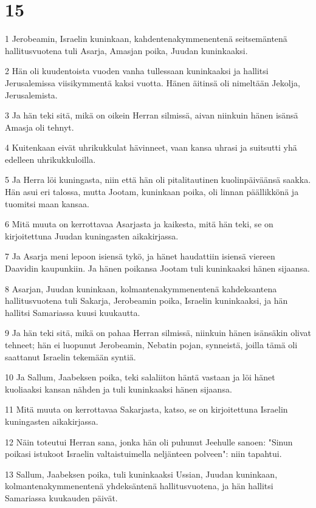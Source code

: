 \chapter{15}

\par 1 Jerobeamin, Israelin kuninkaan, kahdentenakymmenentenä seitsemäntenä hallitusvuotena tuli Asarja, Amasjan poika, Juudan kuninkaaksi.
\par 2 Hän oli kuudentoista vuoden vanha tullessaan kuninkaaksi ja hallitsi Jerusalemissa viisikymmentä kaksi vuotta. Hänen äitinsä oli nimeltään Jekolja, Jerusalemista.
\par 3 Ja hän teki sitä, mikä on oikein Herran silmissä, aivan niinkuin hänen isänsä Amasja oli tehnyt.
\par 4 Kuitenkaan eivät uhrikukkulat hävinneet, vaan kansa uhrasi ja suitsutti yhä edelleen uhrikukkuloilla.
\par 5 Ja Herra löi kuningasta, niin että hän oli pitalitautinen kuolinpäiväänsä saakka. Hän asui eri talossa, mutta Jootam, kuninkaan poika, oli linnan päällikkönä ja tuomitsi maan kansaa.
\par 6 Mitä muuta on kerrottavaa Asarjasta ja kaikesta, mitä hän teki, se on kirjoitettuna Juudan kuningasten aikakirjassa.
\par 7 Ja Asarja meni lepoon isiensä tykö, ja hänet haudattiin isiensä viereen Daavidin kaupunkiin. Ja hänen poikansa Jootam tuli kuninkaaksi hänen sijaansa.
\par 8 Asarjan, Juudan kuninkaan, kolmantenakymmenentenä kahdeksantena hallitusvuotena tuli Sakarja, Jerobeamin poika, Israelin kuninkaaksi, ja hän hallitsi Samariassa kuusi kuukautta.
\par 9 Ja hän teki sitä, mikä on pahaa Herran silmissä, niinkuin hänen isänsäkin olivat tehneet; hän ei luopunut Jerobeamin, Nebatin pojan, synneistä, joilla tämä oli saattanut Israelin tekemään syntiä.
\par 10 Ja Sallum, Jaabeksen poika, teki salaliiton häntä vastaan ja löi hänet kuoliaaksi kansan nähden ja tuli kuninkaaksi hänen sijaansa.
\par 11 Mitä muuta on kerrottavaa Sakarjasta, katso, se on kirjoitettuna Israelin kuningasten aikakirjassa.
\par 12 Näin toteutui Herran sana, jonka hän oli puhunut Jeehulle sanoen: "Sinun poikasi istukoot Israelin valtaistuimella neljänteen polveen": niin tapahtui.
\par 13 Sallum, Jaabeksen poika, tuli kuninkaaksi Ussian, Juudan kuninkaan, kolmantenakymmenentenä yhdeksäntenä hallitusvuotena, ja hän hallitsi Samariassa kuukauden päivät.
